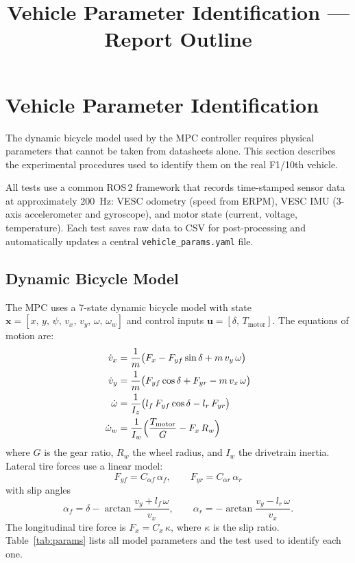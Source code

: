 \documentclass[11pt,a4paper]{article}
\title{Vehicle Parameter Identification --- Report Outline}
\author{}
\date{}
\begin{document}
\maketitle

\section{Vehicle Parameter Identification}\label{sec:param-id}

The dynamic bicycle model used by the MPC controller requires physical
parameters that cannot be taken from datasheets alone.
This section describes the experimental procedures used to identify
them on the real F1/10th vehicle.

All tests use a common ROS\,2 framework that records time-stamped
sensor data at approximately \SI{200}{\hertz}:
VESC odometry (speed from ERPM), VESC IMU (3-axis accelerometer
and gyroscope), and motor state (current, voltage, temperature).
Each test saves raw data to CSV for post-processing and automatically
updates a central \texttt{vehicle\_params.yaml} file.

\subsection{Dynamic Bicycle Model}\label{sec:bicycle-model}

The MPC uses a 7-state dynamic bicycle model with state
$\mathbf{x} = [x,\, y,\, \psi,\, v_x,\, v_y,\, \omega,\, \omega_w]$
and control inputs $\mathbf{u} = [\delta,\, T_\text{motor}]$.
The equations of motion are:
\begin{align}
  \dot{v}_x &= \frac{1}{m}\bigl(F_x - F_{yf}\sin\delta + m\,v_y\,\omega\bigr)
  \label{eq:dvx}\\
  \dot{v}_y &= \frac{1}{m}\bigl(F_{yf}\cos\delta + F_{yr} - m\,v_x\,\omega\bigr)
  \label{eq:dvy}\\
  \dot{\omega} &= \frac{1}{I_z}\bigl(l_f\,F_{yf}\cos\delta - l_r\,F_{yr}\bigr)
  \label{eq:domega}\\
  \dot{\omega}_w &= \frac{1}{I_w}\Bigl(\frac{T_\text{motor}}{G} - F_x\,R_w\Bigr)
  \label{eq:domegaw}
\end{align}
where $G$ is the gear ratio, $R_w$ the wheel radius, and $I_w$ the
drivetrain inertia. Lateral tire forces use a linear model:
\begin{equation}\label{eq:tire-lat}
  F_{yf} = C_{\alpha f}\,\alpha_f, \qquad
  F_{yr} = C_{\alpha r}\,\alpha_r
\end{equation}
with slip angles
\begin{equation}\label{eq:slip-angles}
  \alpha_f = \delta - \arctan\!\frac{v_y + l_f\,\omega}{v_x}, \qquad
  \alpha_r = -\arctan\!\frac{v_y - l_r\,\omega}{v_x}.
\end{equation}
The longitudinal tire force is $F_x = C_x\,\kappa$, where $\kappa$ is the
slip ratio. Table~\ref{tab:params} lists all model parameters and the test
used to identify each one.
\end{document}
